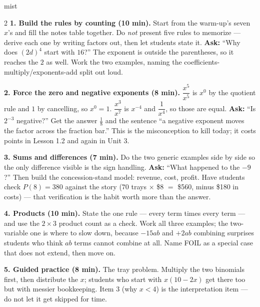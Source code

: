 \documentclass[10pt]{article}
\begin{document}
\boxguard
\begin{skillbox}[Lesson]{mist}
\begin{multicols}{2}
\textbf{1. Build the rules by counting (10 min).} Start from the warm-up's seven $x$'s and fill
the notes table together. Do \emph{not} present five rules to memorize --- derive each one by
writing factors out, then let students state it. \textbf{Ask:} ``Why does $(2d)^4$ start with
$16$?'' The exponent is outside the parentheses, so it reaches the $2$ as well. Work the two
examples, naming the coefficients-multiply/exponents-add split out loud.

\textbf{2. Force the zero and negative exponents (8 min).} $\dfrac{x^5}{x^5}$ is $x^0$ by the
quotient rule and $1$ by cancelling, so $x^0=1$. $\dfrac{x^3}{x^7}$ is $x^{-4}$ and $\dfrac{1}{x^4}$,
so those are equal. \textbf{Ask:} ``Is $2^{-3}$ negative?'' Get the answer $\tfrac18$ and the
sentence ``a negative exponent moves the factor across the fraction bar.'' This is the
misconception to kill today; it costs points in Lesson 1.2 and again in Unit 3.

\textbf{3. Sums and differences (7 min).} Do the two generic examples side by side so the only
difference visible is the sign handling. \textbf{Ask:} ``What happened to the $-9$?'' Then build
the concession-stand model: revenue, cost, profit. Have students check $P(8)=380$ against the
story ($70$ trays $\times$ \$8 $=$ \$560, minus \$180 in costs) --- that verification is the habit
worth more than the answer.

\textbf{4. Products (10 min).} State the one rule --- every term times every term --- and use the
$2\times 3$ product count as a check. Work all three examples; the two-variable one is where to
slow down, because $-15ab$ and $+2ab$ combining surprises students who think $ab$ terms cannot
combine at all. Name FOIL as a special case that does not extend, then move on.

\textbf{5. Guided practice (8 min).} The tray problem. Multiply the two binomials first, then
distribute the $x$; students who start with $x(10-2x)$ get there too but with messier bookkeeping.
Item 3 (why $x<4$) is the interpretation item --- do not let it get skipped for time.
\end{multicols}
\end{skillbox}
\end{document}

